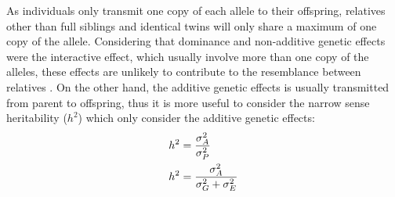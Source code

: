 	As individuals only transmit one copy of each allele to their offspring, relatives other than full siblings and identical twins will only share a maximum of one copy of the allele.
	Considering that dominance and non-additive genetic effects were the interactive effect, which usually involve more than one copy of the alleles, these effects are unlikely to contribute to the resemblance between relatives \citep{Visscher2008}.
	On the other hand, the additive genetic effects is usually transmitted from parent to offspring, thus it is more useful to consider the narrow sense heritability ($h^2$) which only consider the additive genetic effects:
	\begin{align}
	h^2&=\frac{\sigma_A^2}{\sigma_P^2} \notag\\
	h^2&=\frac{\sigma_A^2}{\sigma_G^2+\sigma_E^2}
	\label{eq:narrowHeritability}
	\end{align}
	
